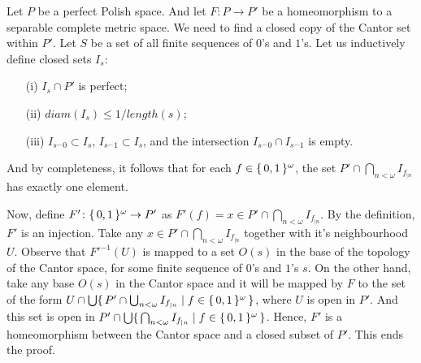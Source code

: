 \documentclass[12pt]{article}
\theoremstyle{definition}
\newenvironment{customthm}[1]
  {\renewcommand\theinnercustomthm{#1}\innercustomthm}
  {\endinnercustomthm}
\begin{document}
\begin{customthm}{I.4.19}
    Let $P$ be a perfect Polish space. And let $F \colon P \to P'$ be a homeomorphism to a separable complete metric space. We need to find a closed copy of the Cantor set within $P'$. Let $S$ be a set of all finite sequences of $0$'s and $1$'s. Let us inductively define closed sets $I_s$:
    \begin{itemize}
        \item[(i)] $I_s \cap P'$ is perfect;
        \item[(ii)] $diam(I_s) \leq 1/length(s)$;
        \item[(iii)] $I_{s^\frown 0} \subset I_s$, $I_{s^\frown 1} \subset I_s$, and the intersection $I_{s^\frown 0} \cap I_{s^\frown 1}$ is empty.
    \end{itemize}
    And by completeness, it follows that for each $f \in \{\,{0,1}\,\}^\omega$, the set $P' \cap \bigcap_{n<\omega} I_{f_{|n}}$ has exactly one element.
    
    Now, define $F' \colon \{\,{0,1}\,\}^\omega \to P'$ as $F'(f) = x \in P' \cap \bigcap_{n<\omega} I_{f_{|n}}$. By the definition, $F'$ is an injection. Take any $x \in P' \cap \bigcap_{n<\omega} I_{f_{|n}}$ together with it's neighbourhood $U$. Observe that $F'^{-1}(U)$ is mapped to a set $O(s)$ in the base of the topology of the Cantor space, for some finite sequence of $0$'s and $1$'s $s$. On the other hand, take any base $O(s)$ in the Cantor space and it will be mapped by $F$ to the set of the form $U \cap \bigcup \{\,{P' \cap \bigcup_{n<\omega} I_{f_{|n}} \mid f \in \{\,{0,1}\,\}^\omega}\,\}$, where $U$ is open in $P'$. And this set is open in $P' \cap \bigcup \{\,{ \bigcap_{n<\omega} I_{f_{|n}} \mid f \in \{\,{0,1}\,\}^\omega}\,\}$. Hence, $F'$ is a homeomorphism between the Cantor space and a closed subset of $P'$. This ends the proof.
\end{customthm}
\end{document}
